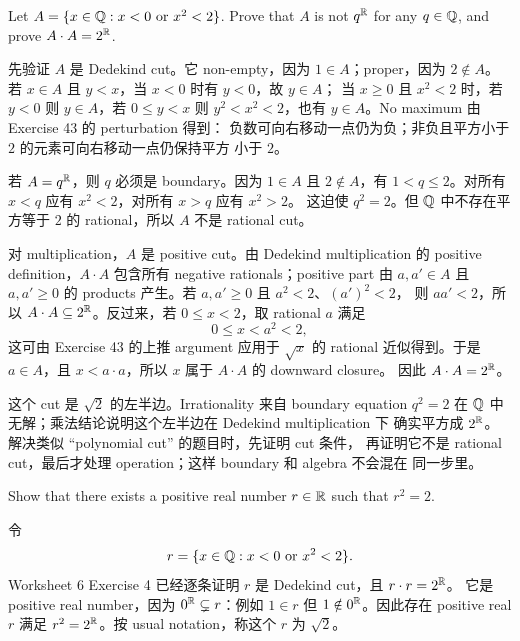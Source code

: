 \begin{exerciseblock}
Let \(A=\{x\in\mathbb{Q}:x<0\text{ or }x^2<2\}\). Prove that \(A\) is not \(q^{\mathbb{R}}\)
for any \(q\in\mathbb{Q}\), and prove \(A\cdot A=2^{\mathbb{R}}\).
\end{exerciseblock}

\begin{solution}
先验证 \(A\) 是 Dedekind cut。它 non-empty，因为 \(1\in A\)；proper，因为
\(2\notin A\)。若 \(x\in A\) 且 \(y<x\)，当 \(x<0\) 时有 \(y<0\)，故 \(y\in A\)；
当 \(x\geq0\) 且 \(x^2<2\) 时，若 \(y<0\) 则 \(y\in A\)，若 \(0\leq y<x\) 则
\(y^2<x^2<2\)，也有 \(y\in A\)。No maximum 由 Exercise 43 的 perturbation 得到：
负数可向右移动一点仍为负；非负且平方小于 \(2\) 的元素可向右移动一点仍保持平方
小于 \(2\)。

若 \(A=q^{\mathbb{R}}\)，则 \(q\) 必须是 boundary。因为 \(1\in A\) 且 \(2\notin A\)，有
\(1<q\leq2\)。对所有 \(x<q\) 应有 \(x^2<2\)，对所有 \(x>q\) 应有 \(x^2>2\)。
这迫使 \(q^2=2\)。但 \(\mathbb{Q}\) 中不存在平方等于 \(2\) 的 rational，所以 \(A\) 不是
rational cut。

对 multiplication，\(A\) 是 positive cut。由 Dedekind multiplication 的 positive
definition，\(A\cdot A\) 包含所有 negative rationals；positive part 由 \(a,a'\in A\)
且 \(a,a'\geq0\) 的 products 产生。若 \(a,a'\geq0\) 且 \(a^2<2\)、\((a')^2<2\)，
则 \(aa'<2\)，所以 \(A\cdot A\subseteq2^{\mathbb{R}}\)。反过来，若 \(0\leq x<2\)，取
rational \(a\) 满足
\[
  0\leq x<a^2<2,
\]
这可由 Exercise 43 的上推 argument 应用于 \(\sqrt{x}\) 的 rational 近似得到。于是
\(a\in A\)，且 \(x<a\cdot a\)，所以 \(x\) 属于 \(A\cdot A\) 的 downward closure。
因此 \(A\cdot A=2^{\mathbb{R}}\)。
\end{solution}

\begin{explanation}
这个 cut 是 \(\sqrt2\) 的左半边。Irrationality 来自 boundary equation
\(q^2=2\) 在 \(\mathbb{Q}\) 中无解；乘法结论说明这个左半边在 Dedekind multiplication 下
确实平方成 \(2^{\mathbb{R}}\)。解决类似 ``polynomial cut'' 的题目时，先证明 cut 条件，
再证明它不是 rational cut，最后才处理 operation；这样 boundary 和 algebra 不会混在
同一步里。
\end{explanation}

\begin{exerciseblock}
Show that there exists a positive real number \(r\in\mathbb{R}\) such that \(r^2=2\).
\end{exerciseblock}

\begin{solution}
令
\[
  r=\{x\in\mathbb{Q}:x<0\text{ or }x^2<2\}.
\]
Worksheet 6 Exercise 4 已经逐条证明 \(r\) 是 Dedekind cut，且 \(r\cdot r=2^{\mathbb{R}}\)。
它是 positive real number，因为 \(0^{\mathbb{R}}\subsetneq r\)：例如 \(1\in r\) 但
\(1\notin0^{\mathbb{R}}\)。因此存在 positive real \(r\) 满足 \(r^2=2^{\mathbb{R}}\)。按 usual
notation，称这个 \(r\) 为 \(\sqrt2\)。
\end{solution}

